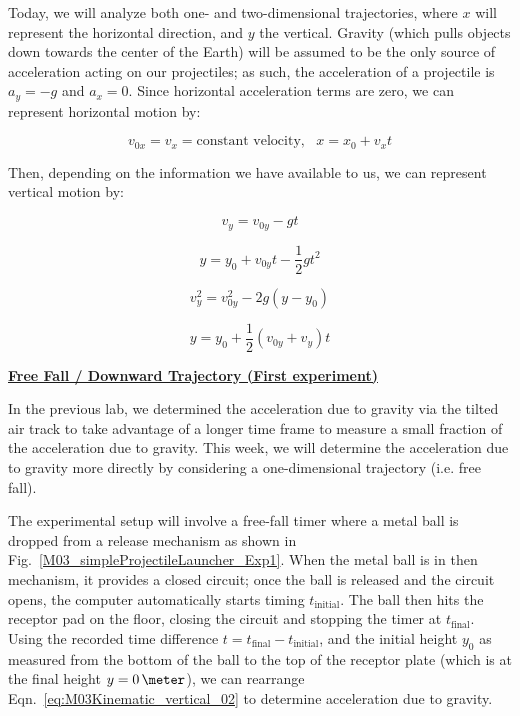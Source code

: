 \pagebreak


Today, we will analyze both one- and two-dimensional trajectories, where $x$ will represent the horizontal direction, and $y$ the vertical. Gravity (which pulls objects down towards the center of the Earth) will be assumed to be the only source of acceleration acting on our projectiles; as such, the acceleration of a projectile is $a_{y} = -g$ and $a_{x} = 0$. Since horizontal acceleration terms are zero, we can represent horizontal motion by:

 \begin{equation}
  \label{eq:M03horizontalKinematic}
  v_{0x} = v_{x} = \text{constant velocity},~~~ x = x_{0} + v_{x}t
\end{equation}

Then, depending on the information we have available to us, we can represent vertical motion by:

 \begin{equation}
  \label{eq:M03Kinematic_vertical_01}
  v_{y} = v_{0y} - gt
\end{equation}


 \begin{equation}
  \label{eq:M03Kinematic_vertical_02}
  y = y_{0} + v_{0y}t - \frac{1}{2}gt^{2}
\end{equation}


 \begin{equation}
  \label{eq:M03Kinematic_vertical_03}
  v_{y}^{2} = v_{0y}^{2} - 2g(y - y_{0})
\end{equation}

 \begin{equation}
  \label{eq:M03Kinematic_vertical_04}
  y = y_{0} + \frac{1}{2}(v_{0y} + v_{y})t
\end{equation}







\underline{\textbf{Free Fall / Downward Trajectory (First experiment)}}

In the previous lab, we determined the acceleration due to gravity via the tilted air track to take advantage of a longer time frame to measure a small fraction of the acceleration due to gravity. This week, we will determine the acceleration due to gravity more directly by considering a one-dimensional trajectory (i.e. free fall).



The experimental setup will involve a free-fall timer where a metal ball is dropped from a release mechanism as shown in Fig.~\ref{M03_simpleProjectileLauncher_Exp1}. When the metal ball is in then mechanism, it provides a closed circuit; once the ball is released and the circuit opens, the computer automatically starts timing $t_{\text{initial}}$. The ball then hits the receptor pad on the floor, closing the circuit and stopping the timer at $t_{\text{final}}$. Using the recorded time difference $t = t_{\text{final}} - t_{\text{initial}}$, and the initial height $y_{0}$ as measured from the bottom of the ball to the top of the receptor plate (which is at the final height $y = 0\,\meter$), we can rearrange Eqn.~\ref{eq:M03Kinematic_vertical_02} to determine acceleration due to gravity.

